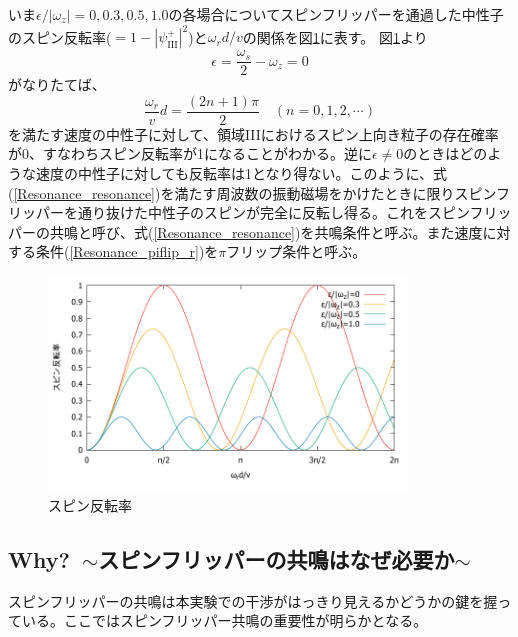 いま$\epsilon/|\omega_z|=0,0.3,0.5,1.0$の各場合についてスピンフリッパーを通過した中性子のスピン反転率($=1-|\psi_\mathrm{III}^+|^2$)と$\omega_r d/v$の関係を図\ref{Resonance_fig_reversalrate}に表す。
図\ref{Resonance_fig_reversalrate}より
\begin{equation}
\epsilon=\frac{\omega_s}{2}-\omega_z=0 \label{Resonance_resonance}
\end{equation}
がなりたてば、
\begin{equation}
\frac{\omega_r}{v}d =\frac{(2n+1)\pi}{2} \quad (n =0,1,2,\cdots) \label{Resonance_piflip_r}
\end{equation}
を満たす速度の中性子に対して、領域IIIにおけるスピン上向き粒子の存在確率が0、すなわちスピン反転率が1になることがわかる。逆に$\epsilon \neq 0$のときはどのような速度の中性子に対しても反転率は1となり得ない。このように、式(\ref{Resonance_resonance})を満たす周波数の振動磁場をかけたときに限りスピンフリッパーを通り抜けた中性子のスピンが完全に反転し得る。これをスピンフリッパーの共鳴と呼び、式(\ref{Resonance_resonance})を共鳴条件と呼ぶ。また速度に対する条件(\ref{Resonance_piflip_r})を$\pi$フリップ条件と呼ぶ。
\begin{figure}[h]
\begin{center}
\includegraphics[width=9.5cm]{resonance/whatwhyhow/resonance_reversalrate.pdf}
\caption{スピン反転率}
\label{Resonance_fig_reversalrate}
\end{center}
\vspace{-1cm}
\end{figure}

\subsection{Why?\ $\sim$スピンフリッパーの共鳴はなぜ必要か$\sim$}
スピンフリッパーの共鳴は本実験での干渉がはっきり見えるかどうかの鍵を握っている。ここではスピンフリッパー共鳴の重要性が明らかとなる。

